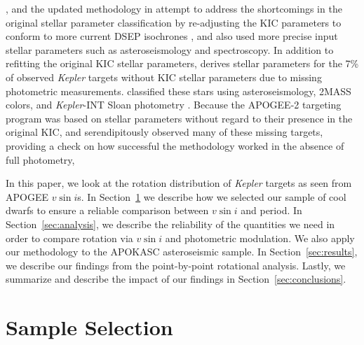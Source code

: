 \documentclass[manuscript]{aastex6}
\newcommand{\vsini}{\ensuremath{v \sin i}}
\newcommand{\Kepler}{\mbox{\textit{Kepler}}}
\begin{document}
\citet{Huber14}, and the updated methodology in \citep{Mathur17} attempt to
address the shortcomings in the original stellar parameter classification by
re-adjusting the KIC parameters to conform to more current DSEP isochrones 
\citep{Dotter08}, and also used more precise input stellar parameters such as
asteroseismology and spectroscopy. In addition to refitting the original KIC 
stellar parameters, \citet{Huber14} derives stellar parameters for the 7\% of 
observed \Kepler{}  
targets without KIC stellar parameters due to missing photometric measurements. 
\citet{Huber14} classified these stars using 
asteroseismology, 2MASS colors, and \Kepler-INT Sloan photometry
\citep{Greiss12}. Because
the APOGEE-2 targeting program \citep{Zasowski17} was based on \citep{Huber14}
stellar parameters without regard to their presence in the original KIC, and
serendipitously observed many of these missing targets, providing a check on
how successful the \citet{Huber14} methodology worked in the absence of full
photometry, 

In this paper, we look at the rotation distribution of \Kepler{} targets as
seen from APOGEE \vsini{}s. In Section~\ref{sec:sample} we describe how we
selected our sample of cool dwarfs to ensure a reliable comparison between
\vsini{} and period. In Section~\ref{sec:analysis}, we describe the reliability
of the quantities we need in order to compare rotation via \vsini{} and
photometric modulation. We also apply our methodology to the APOKASC
asteroseismic sample. In Section~\ref{sec:results}, we describe our findings
from the point-by-point rotational analysis. Lastly, we summarize and describe
the impact of our findings in Section~\ref{sec:conclusions}.

\section{Sample Selection}
\label{sec:sample}
\end{document}
